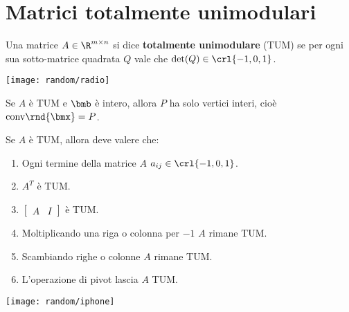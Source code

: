 \documentclass[\main/main.tex]{subfiles}
\begin{document}
\section{Matrici totalmente unimodulari}

\begin{minipage}{\textwidth}
  \begin{minipage}{.83\textwidth}
    \flushleft
    \begin{definition}
      Una matrice $A \in \R^{m \times n}$ si dice \textbf{totalmente unimodulare} (TUM) se per ogni sua sotto-matrice quadrata $Q$ vale che $\det(Q) \in \crl{-1, 0, 1}$.
    \end{definition}
  \end{minipage}\hfill
  \begin{minipage}{0.15\textwidth}\center
    \texttt{[image: random/radio]}
  \end{minipage}
\end{minipage}

\begin{theorem}
  Se $A$ è TUM e $\bmb$ è intero, allora $P$ ha solo vertici interi, cioè $\text{conv}\rnd{\bmx} = P$.
\end{theorem}

\begin{minipage}{\textwidth}
  \begin{minipage}{.83\textwidth}
    \flushleft
    \begin{theorem}
      Se $A$ è TUM, allora deve valere che:
      \begin{enumerate}
        \item Ogni termine della matrice $A$ $a_{ij} \in \crl{-1,0,1}$.
        \item $A^T$ è TUM.
        \item $\begin{bmatrix}
                  A & I
                \end{bmatrix}$ è TUM.
        \item Moltiplicando una riga o colonna per $-1$ $A$ rimane TUM.
        \item Scambiando righe o colonne $A$ rimane TUM.
        \item L'operazione di pivot lascia $A$ TUM.
      \end{enumerate}
    \end{theorem}
  \end{minipage}\hfill
  \begin{minipage}{0.15\textwidth}\center
    \texttt{[image: random/iphone]}
  \end{minipage}
\end{minipage}
\end{document}
